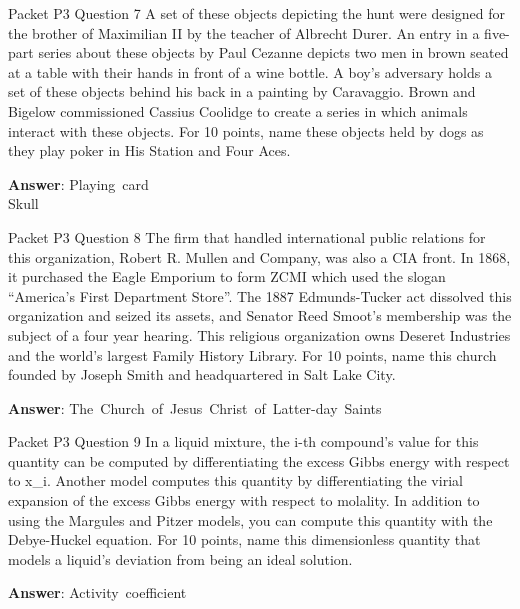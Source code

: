\begin{frame}{Packet P3 Question 7}
A set of these objects depicting the hunt were designed for the brother of Maximilian II by the teacher of Albrecht Durer. An entry in a five-part series about these objects by Paul Cezanne depicts two   men in brown seated at a table with their hands in front of a wine bottle. A boy's   adversary holds a set of these objects behind his back in a painting by Caravaggio. Brown and Bigelow   commissioned Cassius Coolidge to create a series in which animals interact with these objects. For 10 points, name these objects held by dogs as they play poker in His Station and Four Aces.  

\textbf{Answer}: Playing\ card\\
 Skull
\end{frame}

\begin{frame}{Packet P3 Question 8}
The firm that handled international public relations for this organization, Robert R. Mullen and Company, was also a CIA front.  In 1868, it purchased the Eagle Emporium to form ZCMI which used the slogan ``America's First Department Store''.   The 1887 Edmunds-Tucker act dissolved this organization and seized its assets, and Senator Reed Smoot's membership was the subject of a four year hearing.  This religious organization owns Deseret Industries and the world's largest Family History Library.  For 10 points, name this church founded by Joseph Smith and headquartered   in Salt     Lake City.   

\textbf{Answer}: The\ Church\ of\ Jesus\ Christ\ of\ Latter-day\ Saints\\
\end{frame}

\begin{frame}{Packet P3 Question 9}
In a liquid mixture, the i-th compound's value for this quantity can be computed by differentiating the excess Gibbs energy with respect to x\_i. Another model computes this quantity by differentiating the virial expansion   of the excess Gibbs   energy with respect to molality. In addition to using the Margules and Pitzer models, you can compute this quantity with the Debye-Huckel equation. For 10 points,   name this dimensionless quantity that   models a liquid's deviation from being an ideal solution.

\textbf{Answer}: Activity\ coefficient\\
\end{frame}

